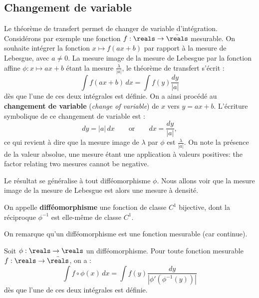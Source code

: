 \subsection{Changement de variable}

Le théorème de transfert permet de changer de variable d'intégration. Considérons
par exemple une fonction $f : \reals \to \bar{\reals}$ mesurable. On souhaite
intégrer la fonction $x \mapsto f(ax+b)$ par rapport à la mesure de Lebesgue, avec
$a \neq 0$. La mesure image de la mesure de Lebesgue par la fonction affine $\phi : x
\mapsto ax+b$ étant la mesure $\frac{\lambda}{|a|}$, le théorème de transfert
s'écrit :
\[
  \int f(ax+b) \, dx = \int f(y) \frac{dy}{|a|}
\]
dès que l'une de ces deux intégrales est définie. On a ainsi procédé au
\textbf{changement de variable} (\textit{change of variable}) de $x$ vers $y =
ax+b$. L'écriture symbolique de ce changement de variable est :
\[
  dy = |a| \, dx
  \qquad \text{or} \qquad
  dx = \frac{dy}{|a|} ,
\]
ce qui revient à dire que la mesure image de $\lambda$ par $\phi$ est
$\frac{\lambda}{|a|}$. On note la présence de la valeur absolue, une mesure étant une
application à valeurs positives: the factor relating two mesures cannot be negative.

Le résultat se généralise à tout difféomorphisme $\phi$. Nous allons voir que la
mesure image de la mesure de Lebesgue est alors une mesure à densité.

\begin{definition}[Difféomorphisme]
  On appelle \textbf{difféomorphisme} une fonction de classe $C^{1}$ bijective, dont
  la réciproque $\phi^{-1}$ est elle-même de classe $C^{1}$.
\end{definition}

On remarque qu'un difféomorphisme est une fonction mesurable (car continue).

\begin{prop}
  Soit $\phi : \reals \to \reals$ un difféomorphisme. Pour toute fonction mesurable
  $f : \reals \to \bar{\reals}$, on a :
  \[
    \int f \circ \phi(x) \, dx
    = \int f(y) \frac{dy}{|\phi'(\phi^{-1}(y))|}
  \]
  dès que l'une de ces deux intégrales est définie.
\end{prop}

